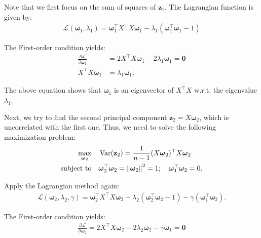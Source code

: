\documentclass[12pt]{article}
\begin{document}
Note that we first focus on the sum of squares of $\mathbf{z}_1$. The Lagrangian function is given by:
\begin{align}
\mathcal{L}(\boldsymbol{\omega}_1, \lambda_1) = \boldsymbol{\omega}_1^\top X^\top X \boldsymbol{\omega}_1 - \lambda_1 (\boldsymbol{\omega}_1^\top \boldsymbol{\omega}_1 - 1)
\end{align}

The First-order condition yields: 
\begin{equation}
\begin{split}
\frac{\partial \mathcal{L}}{\partial \boldsymbol{\omega}_1} &=  2X^\top X \boldsymbol{\omega}_1 - 2\lambda_1 \boldsymbol{\omega}_1 = \mathbf{0} \\
X^\top X \boldsymbol{\omega}_1 &= \lambda_1 \boldsymbol{\omega}_1.
\end{split}
\label{ev1}
\end{equation}

The above equation shows that $\boldsymbol{\omega}_1$ is an eigenvector of $X^\top X$ w.r.t. the eigenvalue $\lambda_1$.

Next, we try to find the second principal component $\mathbf{z}_2 = X \boldsymbol{\omega}_2$, which is uncorrelated with the first one. Thus, we need to solve the following maximization problem:
\begin{equation}
\begin{split}
\max_{ \boldsymbol{\omega}_2} \quad &  \operatorname{Var}(\mathbf{z}_2) = \frac{1}{n-1}  (X \boldsymbol{\omega}_2)^\top X \boldsymbol{\omega}_2 \\
\text{subject to} \quad & \boldsymbol{\omega}_2^\top \boldsymbol{\omega}_2 = \left\|\boldsymbol{\omega}_2\right\|^2 = 1; \quad \boldsymbol{\omega}_1^\top \boldsymbol{\omega}_2 = 0.
\end{split}
\end{equation}

Apply the Lagrangian method again:
\begin{align}
\mathcal{L}(\boldsymbol{\omega}_2, \lambda_2, \gamma) = \boldsymbol{\omega}_2^\top X^\top X \boldsymbol{\omega}_2 - \lambda_2 (\boldsymbol{\omega}_2^\top \boldsymbol{\omega}_2 - 1) - \gamma (\boldsymbol{\omega}_1^\top \boldsymbol{\omega}_2).
\end{align}

The First-order condition yields: 
\begin{align}
\frac{\partial \mathcal{L}}{\partial \boldsymbol{\omega}_2} =  2X^\top X \boldsymbol{\omega}_2 - 2\lambda_2 \boldsymbol{\omega}_2 - \gamma \boldsymbol{\omega}_1 = \mathbf{0} 
\label{foc-2nd-component}
\end{align}
\end{document}
